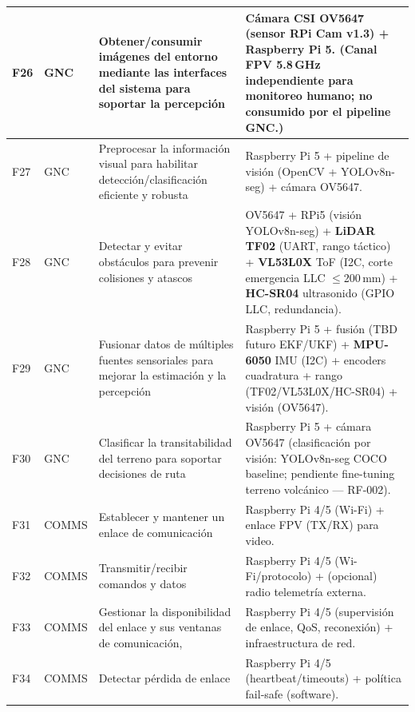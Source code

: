 \begin{landscape}
\begin{longtable}{|p{0.9cm}|p{2.0cm}|p{6.8cm}|p{9.2cm}|}
F26 & GNC & Obtener/consumir imágenes del entorno mediante las interfaces del sistema para soportar la percepción &
Cámara CSI \textbf{OV5647} (sensor RPi Cam v1.3) + Raspberry Pi 5. (Canal FPV 5.8\,GHz independiente para monitoreo humano; no consumido por el pipeline GNC.)\\ \hline

F27 & GNC & Preprocesar la información visual para habilitar detección/clasificación eficiente y robusta &
Raspberry Pi 5 + pipeline de visión (OpenCV + YOLOv8n-seg) + cámara OV5647.\\ \hline

F28 & GNC & Detectar y evitar obstáculos para prevenir colisiones y atascos &
OV5647 + RPi5 (visión YOLOv8n-seg) + \textbf{LiDAR TF02} (UART, rango táctico) + \textbf{VL53L0X} ToF (I2C, corte emergencia LLC $\le$200\,mm) + \textbf{HC-SR04} ultrasonido (GPIO LLC, redundancia).\\ \hline

F29 & GNC & Fusionar datos de múltiples fuentes sensoriales para mejorar la estimación y la percepción &
Raspberry Pi 5 + fusión (TBD futuro EKF/UKF) + \textbf{MPU-6050} IMU (I2C) + encoders cuadratura + rango (TF02/VL53L0X/HC-SR04) + visión (OV5647).\\ \hline

F30 & GNC & Clasificar la transitabilidad del terreno para soportar decisiones de ruta &
Raspberry Pi 5 + cámara OV5647 (clasificación por visión: YOLOv8n-seg COCO baseline; pendiente fine-tuning terreno volcánico --- RF-002).\\ \hline

F31 & COMMS & Establecer y mantener un enlace de comunicación &
Raspberry Pi 4/5 (Wi-Fi) + enlace FPV (TX/RX) para video.\\ \hline

F32 & COMMS & Transmitir/recibir comandos y datos &
Raspberry Pi 4/5 (Wi-Fi/protocolo) + (opcional) radio telemetría externa.\\ \hline

F33 & COMMS & Gestionar la disponibilidad del enlace y sus ventanas de comunicación, &
Raspberry Pi 4/5 (supervisión de enlace, QoS, reconexión) + infraestructura de red.\\ \hline

F34 & COMMS & Detectar pérdida de enlace &
Raspberry Pi 4/5 (heartbeat/timeouts) + política fail-safe (software).\\ \hline


\end{longtable}
\end{landscape}
